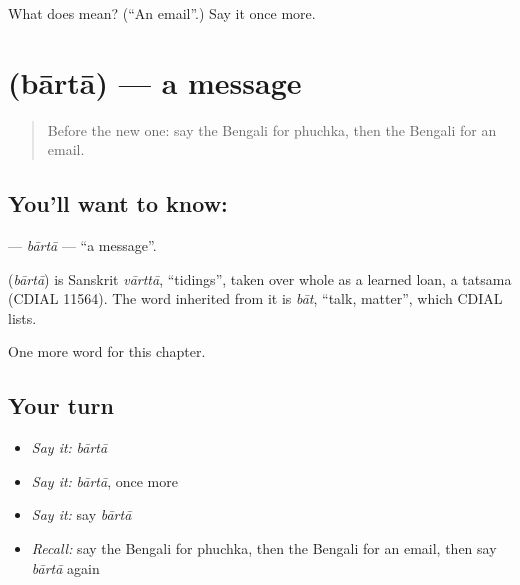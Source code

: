 \begin{tcolorbox}[breakable,colback=teal!4,colframe=teal!35!black,title={Before you move on}]
What does  mean? (\textquotedblleft{}An email\textquotedblright{}.) Say it once more.
\end{tcolorbox}
\section[\texorpdfstring{\bn{বার্তা} (bārtā)}{বার্তা (bārtā)}]{ (bārtā) — a message}

\label{lesson:BN-C258-barta}



\begin{quote}
Before the new one: say the Bengali for phuchka, then the Bengali for an email.
\end{quote}

\subsection*{You'll want to know: }
\textbf{} — \emph{bārtā} — \textquotedblleft{}a message\textquotedblright{}.

\begin{cousinweb}
\textbf{} (\emph{bārtā}) is Sanskrit \emph{vārttā}, \textquotedblleft{}tidings\textquotedblright{}, taken over whole as a learned loan, a tatsama (CDIAL 11564). The word inherited from it is \emph{bāt}, \textquotedblleft{}talk, matter\textquotedblright{}, which CDIAL lists.
\end{cousinweb}

\begin{grammarlens}[title={What you've built}]
One more word for this chapter.
\end{grammarlens}

\subsection*{Your turn}
\begin{itemize}
\raggedright
  \item \emph{Say it:} \emph{bārtā}
  \item \emph{Say it:} \emph{bārtā}, once more
  \item \emph{Say it:} say \emph{bārtā}
  \item \emph{Recall:} say the Bengali for phuchka, then the Bengali for an email, then say \emph{bārtā} again
\end{itemize}

